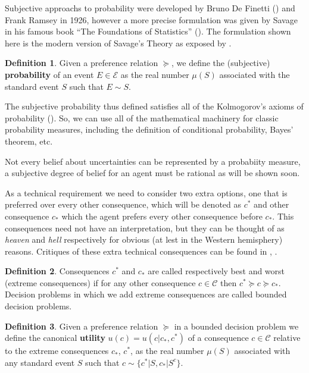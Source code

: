 \documentclass[english,letterpaper,12pt,final]{article}
\theoremstyle{definition}
\newtheorem{defi}{Definition}[section]
\begin{document}
Subjective approachs to probability were developed by Bruno De Finetti (\cite{definetti1930}) and Frank Ramsey in 1926, however a more precise formulation was given by Savage in his famous book “The Foundations of Statistics” (\cite{savage1954the}). The formulation shown here is the modern version of Savage's Theory as exposed by \cite{bernardo2000bayesian}.

	\begin{defi}
	Given a preference relation $\succeq$, we define the (subjective) \textbf{probability} of an event $E \in \mathcal{E}$ as the real number $\mu(S)$ associated with the standard event $S$ such that $E \sim S$.
	\end{defi}
	The subjective probability thus defined satisfies all of the Kolmogorov's axioms of probability (\cite{bernardo2000bayesian}). So, we can use all of the mathematical machinery for classic probability measures, including the definition of conditional probability, Bayes' theorem, etc.
	
Not every belief about uncertainties can be represented by a probabiity measure, a subjective degree of belief for an agent must be rational as will be shown soon.	
	
	As a technical requirement we need to consider two extra options, one that is preferred over every other consequence, which will be denoted as $c^\ast$ and other consequence $c_\ast$ which  the agent prefers every other consequence before $c_\ast$. This consequences need not have an interpretation, but they can be thought of as \textit{heaven} and \textit{hell} respectively for obvious (at lest in the Western hemisphery) reasons. Critiques of these extra technical consequences can be found in \cite{binmore2008rational}, \cite{peterson2017introduction}.
	\begin{defi}
	Consequences $c^\ast$ and $c_\ast$ are called respectively best and worst (extreme consequences) if for any other consequence $c \in \mathcal{C}$ then $c^\ast \succeq c \succeq c_\ast$. Decision problems in which we add extreme consequences are called bounded decision problems.
	\end{defi}
	\begin{defi}
	Given a preference relation $\succeq$ in a bounded decision problem we define the canonical \textbf{utility} $u(c)=u(c | c_\ast, c^\ast)$ of a consequence $c \in \mathcal{C}$ relative to the extreme consequences $c_\ast$, $c^\ast$, as the real number $\mu(S)$ associated with any standard event $S$ such that $c \sim \{c^\ast | S, c_\ast | S^c\}$.
	\end{defi}
\end{document}
